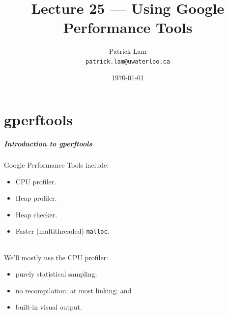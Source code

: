 

\title{Lecture 25 --- Using Google Performance Tools }

\author{Patrick Lam \\ \small \texttt{patrick.lam@uwaterloo.ca}}
\date{\today}




\begin{frame}
  \titlepage

 \end{frame}


\part{gperftools}
\frame{\partpage}

\begin{frame}
  \frametitle{Introduction to gperftools}

\large
\begin{changemargin}{1.5cm}

    Google Performance Tools include:
      
      \begin{itemize}
        \item CPU profiler.
        \item Heap profiler.
        \item Heap checker.
        \item Faster (multithreaded) {\tt malloc}.
      \end{itemize}
~\\[-1em]
     We'll mostly use the CPU profiler:
      \begin{itemize}
        \item purely statistical sampling;
        \item no recompilation; at most linking; and
        \item built-in visual output.
      \end{itemize}
      \end{changemargin}
\end{frame}

